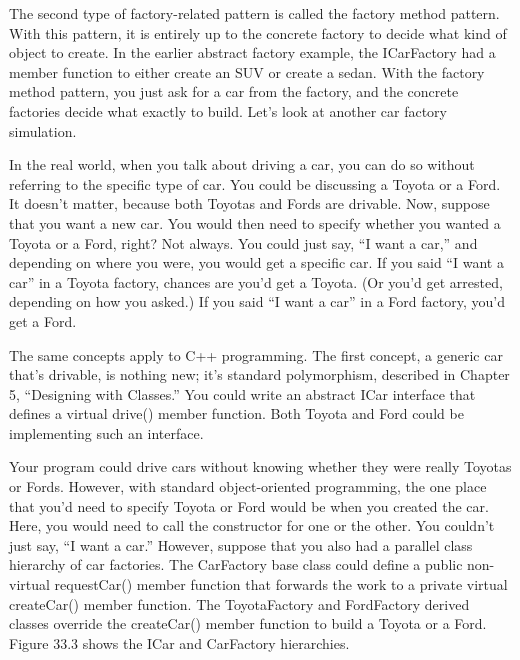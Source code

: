 
The second type of factory-related pattern is called the factory method pattern. With this pattern, it is entirely up to the concrete factory to decide what kind of object to create. In the earlier abstract factory example, the ICarFactory had a member function to either create an SUV or create a sedan. With the factory method pattern, you just ask for a car from the factory, and the concrete factories decide what exactly to build. Let’s look at another car factory simulation.


In the real world, when you talk about driving a car, you can do so without referring to the specific type of car. You could be discussing a Toyota or a Ford. It doesn’t matter, because both Toyotas and Fords are drivable. Now, suppose that you want a new car. You would then need to specify whether you wanted a Toyota or a Ford, right? Not always. You could just say, “I want a car,” and depending on where you were, you would get a specific car. If you said “I want a car” in a Toyota factory, chances are you’d get a Toyota. (Or you’d get arrested, depending on how you asked.) If you said “I want a car” in a Ford factory, you’d get a Ford.

The same concepts apply to C++ programming. The first concept, a generic car that’s drivable, is nothing new; it’s standard polymorphism, described in Chapter 5, “Designing with Classes.” You could write an abstract ICar interface that defines a virtual drive() member function. Both Toyota and Ford could be implementing such an interface.

Your program could drive cars without knowing whether they were really Toyotas or Fords. However, with standard object-oriented programming, the one place that you’d need to specify Toyota or Ford would be when you created the car. Here, you would need to call the constructor for one or the other. You couldn’t just say, “I want a car.” However, suppose that you also had a parallel class hierarchy of car factories. The CarFactory base class could define a public non-virtual requestCar() member function that forwards the work to a private virtual createCar() member function. The ToyotaFactory and FordFactory derived classes override the createCar() member function to build a Toyota or a Ford. Figure 33.3 shows the ICar and CarFactory hierarchies.


